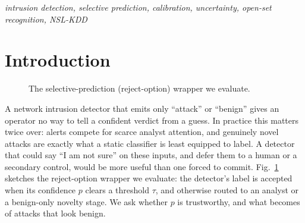 \documentclass[conference,a4paper]{IEEEtran}
\begin{document}
\vspace{\dimexpr 10pt-\parskip\relax}
\begin{IEEEkeywords}
\itshape intrusion detection, selective prediction, calibration, uncertainty, open-set recognition, NSL-KDD
\end{IEEEkeywords}

\linespread{0.95}\selectfont

\section{Introduction}
\begin{figure}[t]
\centering
\footnotesize
{}
\caption{The selective-prediction (reject-option) wrapper we evaluate.}
\label{fig:pipeline}
\end{figure}
A network intrusion detector that emits only ``attack'' or ``benign'' gives an operator no way to tell
a confident verdict from a guess. In practice this matters twice over: alerts compete for scarce
analyst attention, and genuinely novel attacks are exactly what a static classifier is least equipped to
label. A detector that could say ``I am not sure'' on
these inputs, and defer them to a human or a secondary control, would be more useful than one forced to
commit. Fig.~\ref{fig:pipeline} sketches the reject-option wrapper we evaluate: the detector's label is
accepted when its confidence $p$ clears a threshold $\tau$, and otherwise routed to an analyst or a
benign-only novelty stage. We ask whether $p$ is trustworthy, and what becomes of attacks that look
benign.
\end{document}
